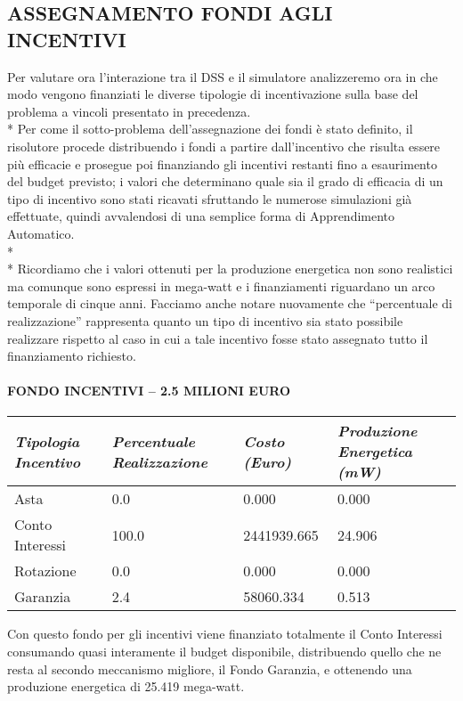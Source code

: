 \documentclass[12pt,a4paper,openright,twoside]{report}
\begin{document}
\subsection{ASSEGNAMENTO FONDI AGLI INCENTIVI}
Per valutare ora l'interazione tra il DSS e il simulatore analizzeremo ora in che modo vengono finanziati le diverse tipologie di incentivazione sulla base del problema a vincoli presentato in precedenza.\\*
Per come il sotto-problema dell'assegnazione dei fondi è stato definito, il risolutore procede distribuendo i fondi a partire dall'incentivo che risulta essere più efficacie e prosegue poi finanziando gli incentivi restanti fino a esaurimento del budget previsto; i valori che determinano quale sia il grado di efficacia di un tipo di incentivo sono stati ricavati sfruttando le numerose simulazioni già effettuate, quindi avvalendosi di una semplice forma di Apprendimento Automatico.
\\* \\*
Ricordiamo che i valori ottenuti per la produzione energetica non sono realistici ma comunque sono espressi in mega-watt e i finanziamenti riguardano un arco temporale di cinque anni. Facciamo anche notare nuovamente che “percentuale di  realizzazione” rappresenta quanto un tipo di incentivo sia stato possibile realizzare rispetto al caso in cui a tale incentivo fosse stato assegnato tutto il finanziamento richiesto.
\paragraph{FONDO INCENTIVI – 2.5 MILIONI EURO}
\begin{center}
	\begin{tabular}{ | p{3.5cm} | p{3.5cm} | p{3.5cm} | p{3.5cm} | }
		\hline
		\nohyphens{\emph{Tipologia Incentivo}} & \nohyphens{\emph{Percentuale Realizzazione}} & \nohyphens{\emph{Costo (Euro)}} & \nohyphens{\emph{Produzione Energetica (mW)}} \\ \hline
		Asta & 0.0 & 0.000 & 0.000 \\ \hline
		Conto Interessi & 100.0 & 2441939.665 & 24.906 \\ \hline
		Rotazione & 0.0 & 0.000 & 0.000 \\ \hline
		Garanzia & 2.4 & 58060.334 & 0.513 \\
		\hline
	\end{tabular}
\end{center}
Con questo fondo per gli incentivi viene finanziato totalmente il Conto Interessi consumando quasi interamente il budget disponibile, distribuendo quello che ne resta al secondo meccanismo migliore, il Fondo Garanzia, e ottenendo una produzione energetica di 25.419 mega-watt.
\end{document}
